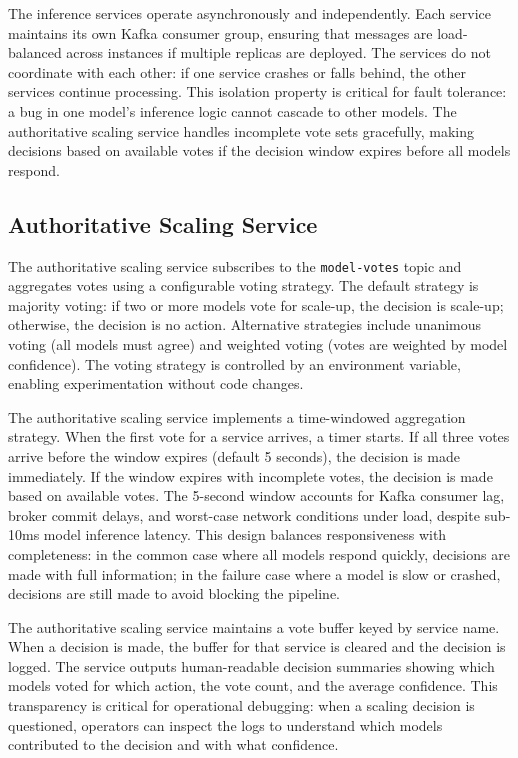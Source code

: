\documentclass[conference]{IEEEtran}
\begin{document}
The inference services operate asynchronously and independently. Each service maintains its own Kafka consumer group, ensuring that messages are load-balanced across instances if multiple replicas are deployed. The services do not coordinate with each other: if one service crashes or falls behind, the other services continue processing. This isolation property is critical for fault tolerance: a bug in one model's inference logic cannot cascade to other models. The authoritative scaling service handles incomplete vote sets gracefully, making decisions based on available votes if the decision window expires before all models respond.

\subsection{Authoritative Scaling Service}

The authoritative scaling service subscribes to the \texttt{model-votes} topic and aggregates votes using a configurable voting strategy. The default strategy is majority voting: if two or more models vote for scale-up, the decision is scale-up; otherwise, the decision is no action. Alternative strategies include unanimous voting (all models must agree) and weighted voting (votes are weighted by model confidence). The voting strategy is controlled by an environment variable, enabling experimentation without code changes.


The authoritative scaling service implements a time-windowed aggregation strategy. When the first vote for a service arrives, a timer starts. If all three votes arrive before the window expires (default 5 seconds), the decision is made immediately. If the window expires with incomplete votes, the decision is made based on available votes. The 5-second window accounts for Kafka consumer lag, broker commit delays, and worst-case network conditions under load, despite sub-10ms model inference latency. This design balances responsiveness with completeness: in the common case where all models respond quickly, decisions are made with full information; in the failure case where a model is slow or crashed, decisions are still made to avoid blocking the pipeline.

The authoritative scaling service maintains a vote buffer keyed by service name. When a decision is made, the buffer for that service is cleared and the decision is logged. The service outputs human-readable decision summaries showing which models voted for which action, the vote count, and the average confidence. This transparency is critical for operational debugging: when a scaling decision is questioned, operators can inspect the logs to understand which models contributed to the decision and with what confidence.
\end{document}
